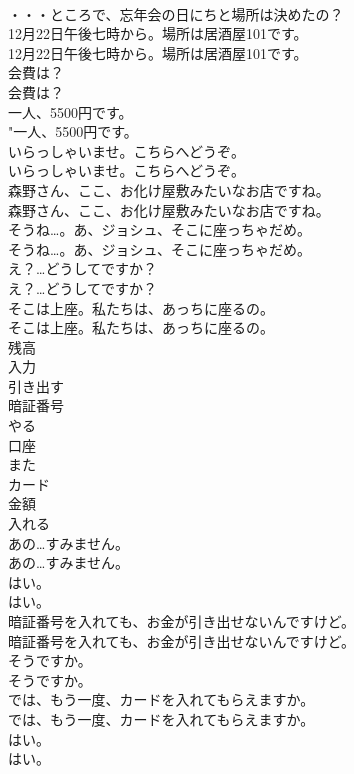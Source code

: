 \documentclass[8pt]{extreport}
\begin{document}
\begin{CJK}{UTF8}{min}
\\	・・・ところで、忘年会の日にちと場所は決めたの？ 
\\	12月22日午後七時から。場所は居酒屋101です。	
\\	12月22日午後七時から。場所は居酒屋101です。 
\\	会費は？	
\\	会費は？ 
\\	一人、5500円です。	
\\	"一人、5500円です。 
\\	いらっしゃいませ。こちらへどうぞ。	
\\	いらっしゃいませ。こちらへどうぞ。 
\\	森野さん、ここ、お化け屋敷みたいなお店ですね。	
\\	森野さん、ここ、お化け屋敷みたいなお店ですね。 
\\	そうね…。あ、ジョシュ、そこに座っちゃだめ。	
\\	そうね…。あ、ジョシュ、そこに座っちゃだめ。 
\\	え？…どうしてですか？	
\\	え？…どうしてですか？ 
\\	そこは上座。私たちは、あっちに座るの。	
\\	そこは上座。私たちは、あっちに座るの。 
\\	残高
\\	入力
\\	引き出す
\\	暗証番号
\\	やる
\\	口座
\\	また
\\	カード
\\	金額
\\	入れる
\\	あの…すみません。	
\\	あの…すみません。 
\\	はい。	
\\	はい。 
\\	暗証番号を入れても、お金が引き出せないんですけど。	
\\	暗証番号を入れても、お金が引き出せないんですけど。 
\\	そうですか。	
\\	そうですか。 
\\	では、もう一度、カードを入れてもらえますか。	
\\	では、もう一度、カードを入れてもらえますか。 
\\	はい。	
\\	はい。 

\end{CJK}
\end{document}
